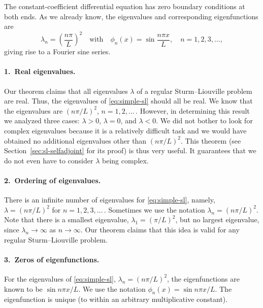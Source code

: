 The constant-coefficient differential equation has zero boundary conditions at both ends.  As we already know, the eigenvalues and corresponding eigenfunctions are
\[
\lambda_n = \left(\frac{n\pi}{L}\right)^2 \quad\text{with}\quad \phi_n(x) = \sin\frac{n\pi x}{L}, \quad n = 1, 2, 3, \ldots,
\]
giving rise to a Fourier sine series.

\paragraph{1.\ Real eigenvalues.}
Our theorem claims that all eigenvalues $\lambda$ of a regular Sturm--Liouville problem are real.  Thus, the eigenvalues of \eqref{eq:simple-sl} should all be real.  We know that the eigenvalues are $(n\pi/L)^2$, $n = 1, 2, \ldots$\,.  However, in determining this result we analyzed three cases: $\lambda > 0$, $\lambda = 0$, and $\lambda < 0$.  We did not bother to look for complex eigenvalues because it is a relatively difficult task and we would have obtained no additional eigenvalues other than $(n\pi/L)^2$.  This theorem (see Section~\ref{sec:sl-selfadjoint} for its proof) is thus very useful.  It guarantees that we do not even have to consider $\lambda$ being complex.

\paragraph{2.\ Ordering of eigenvalues.}
There is an infinite number of eigenvalues for \eqref{eq:simple-sl}, namely, $\lambda = (n\pi/L)^2$ for $n = 1, 2, 3, \ldots$\,.  Sometimes we use the notation $\lambda_n = (n\pi/L)^2$.  Note that there is a smallest eigenvalue, $\lambda_1 = (\pi/L)^2$, but no largest eigenvalue, since $\lambda_n \to \infty$ as $n \to \infty$.  Our theorem claims that this idea is valid for any regular Sturm--Liouville problem.

\paragraph{3.\ Zeros of eigenfunctions.}
For the eigenvalues of \eqref{eq:simple-sl}, $\lambda_n = (n\pi/L)^2$, the eigenfunctions are known to be $\sin n\pi x/L$.  We use the notation $\phi_n(x) = \sin n\pi x/L$.  The eigenfunction is unique (to within an arbitrary multiplicative constant).

